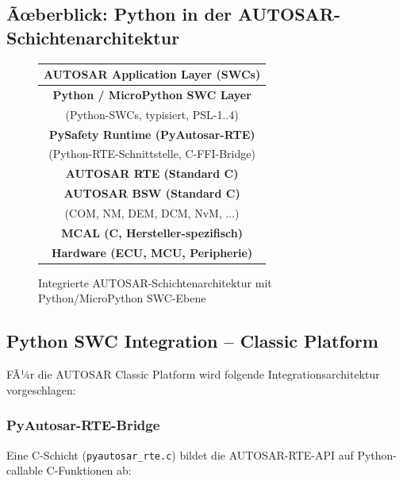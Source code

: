 ﻿\documentclass[12pt,a4paper,twoside]{article}
\begin{document}
\subsection{Ãœberblick: Python in der AUTOSAR-Schichtenarchitektur}
\label{subsec:schichten}

\begin{figure}[h]
\centering
\begin{tabular}{|c|}
\hline
\rowcolor{autosarblue!30}
\textbf{AUTOSAR Application Layer (SWCs)} \\
\hline
\rowcolor{pythonblue!20}
\textbf{Python / MicroPython SWC Layer} \\
(Python-SWCs, typisiert, PSL-1..4) \\
\hline
\rowcolor{pythonblue!10}
\textbf{PySafety Runtime (PyAutosar-RTE)} \\
(Python-RTE-Schnittstelle, C-FFI-Bridge) \\
\hline
\rowcolor{gray!20}
\textbf{AUTOSAR RTE (Standard C)} \\
\hline
\rowcolor{gray!10}
\textbf{AUTOSAR BSW (Standard C)} \\
(COM, NM, DEM, DCM, NvM, ...) \\
\hline
\rowcolor{gray!5}
\textbf{MCAL (C, Hersteller-spezifisch)} \\
\hline
\rowcolor{lightgray}
\textbf{Hardware (ECU, MCU, Peripherie)} \\
\hline
\end{tabular}
\caption{Integrierte AUTOSAR-Schichtenarchitektur mit Python/MicroPython SWC-Ebene}
\label{fig:architektur}
\end{figure}

\subsection{Python SWC Integration -- Classic Platform}
\label{subsec:cp_integration}

FÃ¼r die AUTOSAR Classic Platform wird folgende Integrationsarchitektur vorgeschlagen:

\subsubsection{PyAutosar-RTE-Bridge}
Eine C-Schicht (\texttt{pyautosar\_rte.c}) bildet die AUTOSAR-RTE-API
auf Python-callable C-Funktionen ab:
\end{document}
